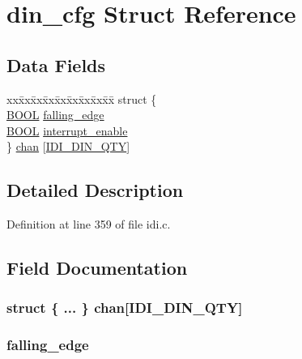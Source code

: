 \hypertarget{structdin__cfg}{\section{din\+\_\+cfg Struct Reference}
\label{structdin__cfg}
}
\subsection*{Data Fields}
\begin{DoxyCompactItemize}
\item 
\begin{tabbing}
xx\=xx\=xx\=xx\=xx\=xx\=xx\=xx\=xx\=\kill
struct \{\\
\>\hyperlink{idi_8c_a050c65e107f0c828f856a231f4b4e788}{BOOL} \hyperlink{structdin__cfg_a2ffbf2409b32f9aeccf526a775fb5a61}{falling\_edge}\\
\>\hyperlink{idi_8c_a050c65e107f0c828f856a231f4b4e788}{BOOL} \hyperlink{structdin__cfg_af2843635bd1b2022a5e6dcaec702d780}{interrupt\_enable}\\
\} \hyperlink{structdin__cfg_aa99e288cbad00f916f13ada13d41d05d}{chan} \mbox{[}\hyperlink{idi_8c_ac0b401f4d27a710797a76887edbc77da}{IDI\_DIN\_QTY}\mbox{]}\\

\end{tabbing}\end{DoxyCompactItemize}


\subsection{Detailed Description}


Definition at line 359 of file idi.\+c.



\subsection{Field Documentation}
\hypertarget{structdin__cfg_aa99e288cbad00f916f13ada13d41d05d}{
\subsubsection[{chan}]{\setlength{\rightskip}{0pt plus 5cm}struct \{ ... \}   chan\mbox{[}{\bf I\+D\+I\+\_\+\+D\+I\+N\+\_\+\+Q\+T\+Y}\mbox{]}}}\label{structdin__cfg_aa99e288cbad00f916f13ada13d41d05d}
\hypertarget{structdin__cfg_a2ffbf2409b32f9aeccf526a775fb5a61}{
\subsubsection[{falling\+\_\+edge}]{ falling\+\_\+edge}}\label{structdin__cfg_a2ffbf2409b32f9aeccf526a775fb5a61}


